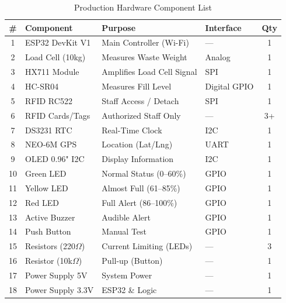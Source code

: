 \documentclass[12pt,a4paper]{article}
\begin{document}
\begin{table}[H]
\centering
\caption{Production Hardware Component List}
\label{tab:production_components}
\footnotesize
\begin{tabular}{@{}clllc@{}}
\toprule
\textbf{\#} & \textbf{Component} & \textbf{Purpose} & \textbf{Interface} & \textbf{Qty} \\
\midrule
1  & ESP32 DevKit V1     & Main Controller (Wi-Fi)       & ---          & 1 \\
2  & Load Cell (10kg)    & Measures Waste Weight          & Analog       & 1 \\
3  & HX711 Module        & Amplifies Load Cell Signal     & SPI          & 1 \\
4  & HC-SR04             & Measures Fill Level            & Digital GPIO & 1 \\
5  & RFID RC522          & Staff Access / Detach          & SPI          & 1 \\
6  & RFID Cards/Tags     & Authorized Staff Only          & ---          & 3+ \\
7  & DS3231 RTC          & Real-Time Clock                & I2C          & 1 \\
8  & NEO-6M GPS          & Location (Lat/Lng)             & UART         & 1 \\
9  & OLED 0.96" I2C      & Display Information            & I2C          & 1 \\
10 & Green LED           & Normal Status (0--60\%)        & GPIO         & 1 \\
11 & Yellow LED          & Almost Full (61--85\%)         & GPIO         & 1 \\
12 & Red LED             & Full Alert (86--100\%)         & GPIO         & 1 \\
13 & Active Buzzer       & Audible Alert                  & GPIO         & 1 \\
14 & Push Button         & Manual Test                    & GPIO         & 1 \\
15 & Resistors (220$\Omega$) & Current Limiting (LEDs)    & ---          & 3 \\
16 & Resistor (10k$\Omega$)  & Pull-up (Button)           & ---          & 1 \\
17 & Power Supply 5V     & System Power                   & ---          & 1 \\
18 & Power Supply 3.3V   & ESP32 \& Logic                 & ---          & 1 \\
\bottomrule
\end{tabular}
\end{table}
\end{document}
